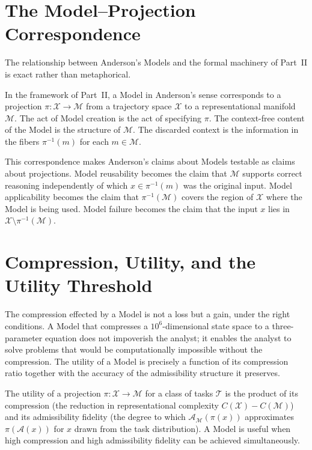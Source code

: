 \documentclass[12pt, a4paper, oneside]{book}
\newcommand{\Adm}{\mathcal{A}}
\newcommand{\X}{\mathcal{X}}
\newcommand{\M}{\mathcal{M}}
\newcommand{\proj}{\pi}
\begin{document}
\section{The Model--Projection Correspondence}

The relationship between Anderson's Models and the formal machinery of
Part~II is exact rather than metaphorical.

\begin{proposition}
\label{prop:models-are-projections}
In the framework of Part~II, a Model in Anderson's sense corresponds to a
projection $\proj : \X \to \M$ from a trajectory space $\X$ to a
representational manifold $\M$.
The act of Model creation is the act of specifying $\proj$.
The context-free content of the Model is the structure of $\M$.
The discarded context is the information in the fibers $\proj^{-1}(m)$
for each $m \in \M$.
\end{proposition}

This correspondence makes Anderson's claims about Models testable as
claims about projections. Model reusability becomes the claim that $\M$
supports correct reasoning independently of which $x \in \proj^{-1}(m)$
was the original input. Model applicability becomes the claim that
$\proj^{-1}(\M)$ covers the region of $\X$ where the Model is being used.
Model failure becomes the claim that the input $x$ lies in
$\X \setminus \proj^{-1}(\M)$.

\section{Compression, Utility, and the Utility Threshold}

The compression effected by a Model is not a loss but a gain, under the
right conditions. A Model that compresses a $10^6$-dimensional state
space to a three-parameter equation does not impoverish the analyst;
it enables the analyst to solve problems that would be computationally
impossible without the compression. The utility of a Model is precisely
a function of its compression ratio together with the accuracy of the
admissibility structure it preserves.

\begin{definition}
\label{def:model-utility}
The utility of a projection $\proj : \X \to \M$ for a class of tasks
$\mathcal{T}$ is the product of its compression (the reduction in
representational complexity $C(\X) - C(\M)$) and its admissibility
fidelity (the degree to which $\Adm_\M(\proj(x))$ approximates
$\proj(\Adm(x))$ for $x$ drawn from the task distribution).
A Model is useful when high compression and high admissibility fidelity
can be achieved simultaneously.
\end{definition}
\end{document}
